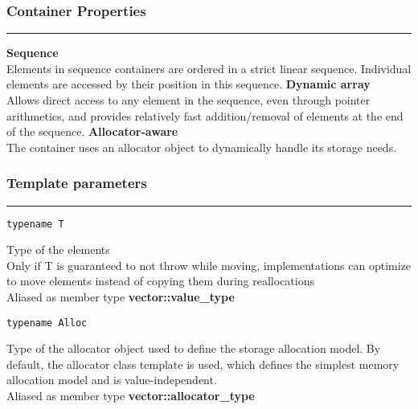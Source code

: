 \documentclass{report}
\begin{document}
\subsubsection{Container Properties}
\hrule \vspace{3mm}
\textbf{Sequence} \vspace{1mm} \\ 
Elements in sequence containers are ordered in a strict linear sequence. Individual elements are accessed by their position in this sequence.
\bigbreak \noindent
\textbf{Dynamic array} \vspace{1mm} \\
Allows direct access to any element in the sequence, even through pointer arithmetics, and provides relatively fast addition/removal of elements at the end of the sequence.
\bigbreak\noindent
\textbf{Allocator-aware} \vspace{1mm} \\ 
The container uses an allocator object to dynamically handle its storage needs.
\subsubsection{Template parameters}
\hrule \vspace{3mm}
\begin{verbatim}
typename T
\end{verbatim}
Type of the elements \vspace{1.5mm} \\ 
Only if T is guaranteed to not throw while moving, implementations can optimize to move elements instead of copying them during reallocations \vspace{1.5mm} \\ 
Aliased as member type \textbf{vector::value\_type}
\begin{verbatim}
typename Alloc
\end{verbatim}
Type of the allocator object used to define the storage allocation model. By default, the allocator class template is used, which defines the simplest memory allocation model and is value-independent.  \vspace{1.5mm} \\ 
Aliased as member type \textbf{vector::allocator\_type}
\end{document}

